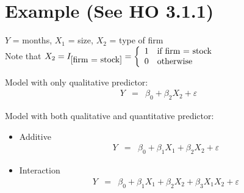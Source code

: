 \documentclass[12pt]{notes}
\begin{document}
\section{Example (See HO 3.1.1)}
$Y$ = months, $X_1$ = size, $X_2$ = type of firm\\

Note that $X_2=I_{\mbox{[firm = stock]}} = \left\{ \begin{array}{l l}
             1 & \mbox{if firm = stock}\\
             0 & \mbox{otherwise}
            \end{array} \right.$\\

\vspace{2em}

Model with only qualitative predictor:
\begin{eqnarray}
      Y & = & \beta_0 + \beta_2 X_2 + \varepsilon \nonumber
\end{eqnarray}

Model with both qualitative and quantitative predictor:
\begin{itemize}
  \item Additive
  \begin{eqnarray}
 Y & = & \beta_0 + \beta_1 X_1 + \beta_2 X_2 + \varepsilon \nonumber
\end{eqnarray}
  \item Interaction
  \begin{eqnarray}
 Y & = & \beta_0 + \beta_1 X_1 + \beta_2 X_2 + \beta_3 X_1 X_2 + \varepsilon \nonumber
\end{eqnarray}
\end{itemize}
\end{document}
